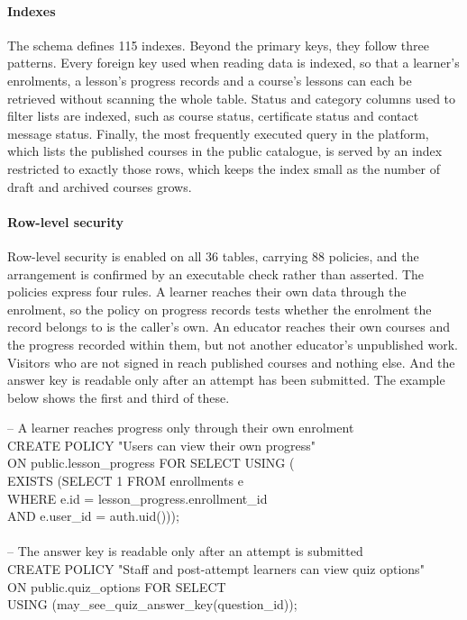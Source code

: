 \documentclass[12pt, oneside]{article} %
\begin{document}
\paragraph{Indexes}

The schema defines 115 indexes. Beyond the primary keys, they follow three patterns. Every foreign key used when reading data is indexed, so that a learner's enrolments, a lesson's progress records and a course's lessons can each be retrieved without scanning the whole table. Status and category columns used to filter lists are indexed, such as course status, certificate status and contact message status. Finally, the most frequently executed query in the platform, which lists the published courses in the public catalogue, is served by an index restricted to exactly those rows, which keeps the index small as the number of draft and archived courses grows.

\paragraph{Row-level security}

Row-level security is enabled on all 36 tables, carrying 88 policies, and the arrangement is confirmed by an executable check rather than asserted. The policies express four rules. A learner reaches their own data through the enrolment, so the policy on progress records tests whether the enrolment the record belongs to is the caller's own. An educator reaches their own courses and the progress recorded within them, but not another educator's unpublished work. Visitors who are not signed in reach published courses and nothing else. And the answer key is readable only after an attempt has been submitted. The example below shows the first and third of these.

\begin{tcolorbox}[listing only, breakable, boxsep=2pt, left=2pt, right=2pt]
\footnotesize\ttfamily
-- A learner reaches progress only through their own enrolment \\
CREATE POLICY "Users can view their own progress" \\
ON public.lesson\_progress FOR SELECT USING ( \\
\hspace*{4mm}EXISTS (SELECT 1 FROM enrollments e \\
\hspace*{12mm}WHERE e.id = lesson\_progress.enrollment\_id \\
\hspace*{14mm}AND e.user\_id = auth.uid())); \\
\ \\
-- The answer key is readable only after an attempt is submitted \\
CREATE POLICY "Staff and post-attempt learners can view quiz options" \\
ON public.quiz\_options FOR SELECT \\
\hspace*{4mm}USING (may\_see\_quiz\_answer\_key(question\_id));
\end{tcolorbox}
\end{document}
